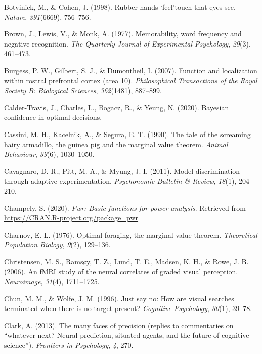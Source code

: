 \documentclass[12pt,twoside]{reedthesis}
\begin{document}
\leavevmode\hypertarget{ref-botvinick1998rubber}{}%
Botvinick, M., \& Cohen, J. (1998). Rubber hands `feel'touch that eyes see. \emph{Nature}, \emph{391}(6669), 756--756.

\leavevmode\hypertarget{ref-brown1977memorability}{}%
Brown, J., Lewis, V., \& Monk, A. (1977). Memorability, word frequency and negative recognition. \emph{The Quarterly Journal of Experimental Psychology}, \emph{29}(3), 461--473.

\leavevmode\hypertarget{ref-burgess2007function}{}%
Burgess, P. W., Gilbert, S. J., \& Dumontheil, I. (2007). Function and localization within rostral prefrontal cortex (area 10). \emph{Philosophical Transactions of the Royal Society B: Biological Sciences}, \emph{362}(1481), 887--899.

\leavevmode\hypertarget{ref-calder2020bayesian}{}%
Calder-Travis, J., Charles, L., Bogacz, R., \& Yeung, N. (2020). Bayesian confidence in optimal decisions.

\leavevmode\hypertarget{ref-cassini1990tale}{}%
Cassini, M. H., Kacelnik, A., \& Segura, E. T. (1990). The tale of the screaming hairy armadillo, the guinea pig and the marginal value theorem. \emph{Animal Behaviour}, \emph{39}(6), 1030--1050.

\leavevmode\hypertarget{ref-cavagnaro2011model}{}%
Cavagnaro, D. R., Pitt, M. A., \& Myung, J. I. (2011). Model discrimination through adaptive experimentation. \emph{Psychonomic Bulletin \& Review}, \emph{18}(1), 204--210.

\leavevmode\hypertarget{ref-R-pwr}{}%
Champely, S. (2020). \emph{Pwr: Basic functions for power analysis}. Retrieved from \url{https://CRAN.R-project.org/package=pwr}

\leavevmode\hypertarget{ref-charnov1976optimal}{}%
Charnov, E. L. (1976). Optimal foraging, the marginal value theorem. \emph{Theoretical Population Biology}, \emph{9}(2), 129--136.

\leavevmode\hypertarget{ref-christensen2006fmri}{}%
Christensen, M. S., Ramsøy, T. Z., Lund, T. E., Madsen, K. H., \& Rowe, J. B. (2006). An fMRI study of the neural correlates of graded visual perception. \emph{Neuroimage}, \emph{31}(4), 1711--1725.

\leavevmode\hypertarget{ref-chun1996just}{}%
Chun, M. M., \& Wolfe, J. M. (1996). Just say no: How are visual searches terminated when there is no target present? \emph{Cognitive Psychology}, \emph{30}(1), 39--78.

\leavevmode\hypertarget{ref-clark2013many}{}%
Clark, A. (2013). The many faces of precision (replies to commentaries on ``whatever next? Neural prediction, situated agents, and the future of cognitive science''). \emph{Frontiers in Psychology}, \emph{4}, 270.
\end{document}
